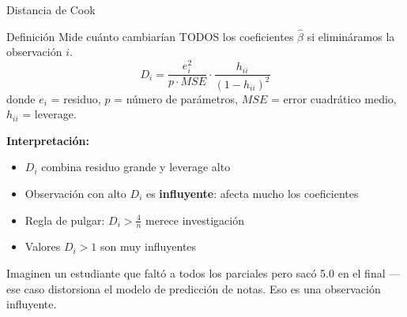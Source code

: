 \documentclass[aspectratio=169, 11pt]{beamer}
\begin{document}
\begin{frame}{Distancia de Cook}
\begin{block}{Definición}
Mide cuánto cambiarían TODOS los coeficientes $\hat{\beta}$ si elimináramos la observación $i$.
$$D_i = \frac{e_i^2}{p \cdot MSE} \cdot \frac{h_{ii}}{(1-h_{ii})^2}$$
donde $e_i$ = residuo, $p$ = número de parámetros, $MSE$ = error cuadrático medio, $h_{ii}$ = leverage.
\end{block}

\vspace{0.15cm}
\textbf{Interpretaci\'on:}
\begin{itemize}
\item $D_i$ combina residuo grande y leverage alto
\item Observaci\'on con alto $D_i$ es \textbf{influyente}: afecta mucho los coeficientes
\item Regla de pulgar: $D_i > \frac{4}{n}$ merece investigaci\'on
\item Valores $D_i > 1$ son muy influyentes
\end{itemize}

\smallskip
\small Imaginen un estudiante que falt\'o a todos los parciales pero sac\'o 5.0 en el final --- ese caso distorsiona el modelo de predicci\'on de notas. Eso es una observaci\'on influyente.
\end{frame}
\end{document}
